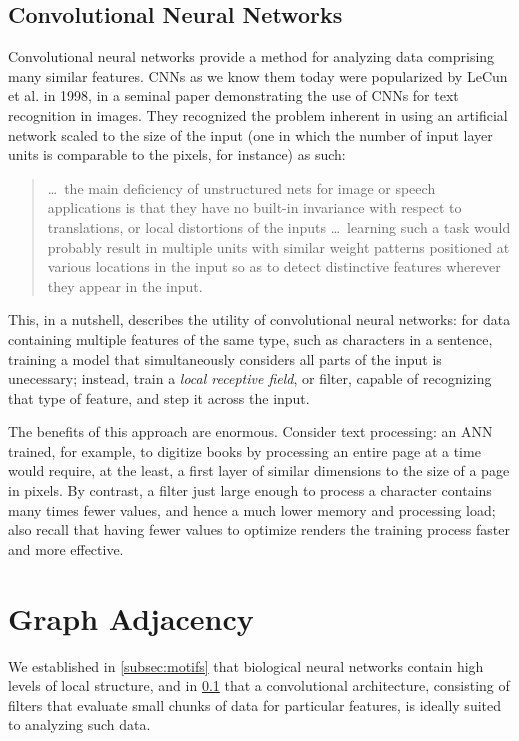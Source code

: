 \subsection{Convolutional Neural Networks}
\label{subsec:convnets}
Convolutional neural networks provide a method for analyzing data comprising 
many similar features. CNNs as we know them today were popularized by
LeCun et al. in 1998, in a seminal paper\cite{lecun1998gradient} demonstrating 
the use of CNNs for text recognition in images. They recognized the problem 
inherent in using an artificial network scaled to the size of the input (one in 
which the number of input layer units is comparable to the pixels, for instance)
as such:
\begin{quote}
	\ldots\ the main deficiency of unstructured nets for image or speech 
	applications is that they have no built-in invariance with respect to 
	translations, or local distortions of the inputs \ldots\ learning such a 
	task would probably result in multiple units with similar weight patterns 
	positioned at various locations in the input so as to detect distinctive 
	features wherever they appear in the input.\cite[p.~5]{lecun1998gradient}
\end{quote}
This, in a nutshell, describes the utility of convolutional neural networks: for 
data containing multiple features of the same type, such as characters in a 
sentence, training a model that simultaneously considers all parts of the input 
is unecessary; instead, train a \textit{local receptive field}, or filter, 
capable of recognizing that type of feature, and step it across the input.

The benefits of this approach are enormous. Consider text processing: an ANN 
trained, for example, to digitize books by processing an entire page at a time 
would require, at the least, a first layer of similar dimensions to the size of 
a page in pixels. By contrast, a filter just large enough to process a character 
contains many times fewer values, and hence a much lower memory and processing 
load; also recall that having fewer values to optimize renders the training 
process faster and more effective.


\section{Graph Adjacency}
We established in \ref{subsec:motifs} that biological neural networks contain 
high levels of local structure, and in \ref{subsec:convnets} that a 
convolutional architecture, consisting of filters that evaluate small chunks of 
data for particular features, is ideally suited to analyzing such data.

